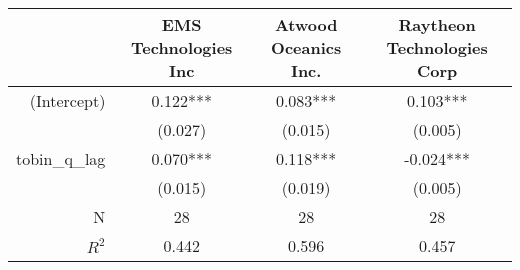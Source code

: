 \begin{tabular}{r|ccc}
\toprule
              & EMS Technologies Inc & Atwood Oceanics Inc. & Raytheon Technologies Corp \\ \hline
  (Intercept) &             0.122*** &             0.083*** &                   0.103*** \\
              &              (0.027) &              (0.015) &                    (0.005) \\
tobin\_q\_lag &             0.070*** &             0.118*** &                  -0.024*** \\
              &              (0.015) &              (0.019) &                    (0.005) \\ \hline
            N &                   28 &                   28 &                         28 \\
        $R^2$ &                0.442 &                0.596 &                      0.457 \\
\bottomrule
\end{tabular}